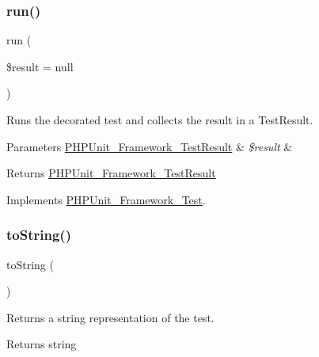 \subsubsection{\texorpdfstring{run()}{run()}}
{\footnotesize\ttfamily run (\begin{DoxyParamCaption}\item[{\mbox{\hyperlink{class_p_h_p_unit___framework___test_result}{P\+H\+P\+Unit\+\_\+\+Framework\+\_\+\+Test\+Result}}}]{\$result = {\ttfamily null} }\end{DoxyParamCaption})}

Runs the decorated test and collects the result in a Test\+Result.


\begin{DoxyParams}[1]{Parameters}
\mbox{\hyperlink{class_p_h_p_unit___framework___test_result}{P\+H\+P\+Unit\+\_\+\+Framework\+\_\+\+Test\+Result}} & {\em \$result} & \\
\hline
\end{DoxyParams}
\begin{DoxyReturn}{Returns}
\mbox{\hyperlink{class_p_h_p_unit___framework___test_result}{P\+H\+P\+Unit\+\_\+\+Framework\+\_\+\+Test\+Result}} 
\end{DoxyReturn}


Implements \mbox{\hyperlink{interface_p_h_p_unit___framework___test_aba2e5a83092b40735a7a61c572cd6256}{P\+H\+P\+Unit\+\_\+\+Framework\+\_\+\+Test}}.

\mbox{\label{class_p_h_p_unit___extensions___test_decorator_a5558c5d549f41597377fa1ea8a1cefa3}} 
\subsubsection{\texorpdfstring{to\+String()}{toString()}}
{\footnotesize\ttfamily to\+String (\begin{DoxyParamCaption}{ }\end{DoxyParamCaption})}

Returns a string representation of the test.

\begin{DoxyReturn}{Returns}
string 
\end{DoxyReturn}


